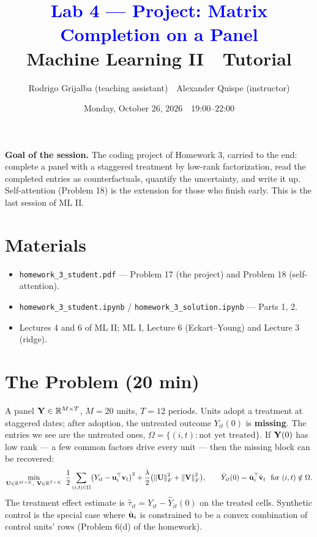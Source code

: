 \documentclass[11pt]{article}
\title{\textcolor{blue}{Lab 4 --- Project: Matrix Completion on a Panel}\\[4pt]
\large Machine Learning II \,\textperiodcentered\, Tutorial}
\author{Rodrigo Grijalba (teaching assistant) \,\textperiodcentered\, Alexander Quispe (instructor)}
\date{Monday, October 26, 2026 \,\textperiodcentered\, 19:00--22:00}
\begin{document}
\maketitle

\begin{keypoint}
\textbf{Goal of the session.} The coding project of Homework 3, carried to the end: complete a panel
with a staggered treatment by low-rank factorization, read the completed entries as counterfactuals,
quantify the uncertainty, and write it up. Self-attention (Problem 18) is the extension for those who
finish early. This is the last session of ML II.
\end{keypoint}

\section*{Materials}
\begin{itemize}[nosep]
  \item \texttt{homework\_3\_student.pdf} --- Problem 17 (the project) and Problem 18 (self-attention).
  \item \texttt{homework\_3\_student.ipynb} / \texttt{homework\_3\_solution.ipynb} --- Parts 1, 2.
  \item Lectures 4 and 6 of ML II; ML I, Lecture 6 (Eckart--Young) and Lecture 3 (ridge).
\end{itemize}

\section{The Problem (20 min)}
A panel $\mathbf{Y}\in\mathbb{R}^{M\times T}$, $M=20$ units, $T=12$ periods. Units adopt a treatment at staggered dates;
after adoption, the untreated outcome $Y_{it}(0)$ is \textbf{missing}. The entries we see are the
untreated ones, $\Omega=\{(i,t):\text{not yet treated}\}$. If $\mathbf{Y}(0)$ has low rank --- a few common
factors drive every unit --- then the missing block can be recovered:
\[
\min_{\vU\in\R^{M\times K},\ \vV\in\R^{T\times K}}\ \frac12\sum_{(i,t)\in\Omega}\bigl(Y_{it}-\vu_i\T\vv_t\bigr)^2
+\frac\lambda2\bigl(\norm\vU_F^2+\norm\vV_F^2\bigr),
\qquad
\hat Y_{it}(0)=\hat\vu_i\T\hat\vv_t\ \text{ for }(i,t)\notin\Omega .
\]
The treatment effect estimate is $\hat\tau_{it}=Y_{it}-\hat Y_{it}(0)$ on the treated cells. Synthetic
control is the special case where $\hat{\mathbf{u}}_i$ is constrained to be a convex combination of control units'
rows (Problem 6(d) of the homework).
\end{document}
